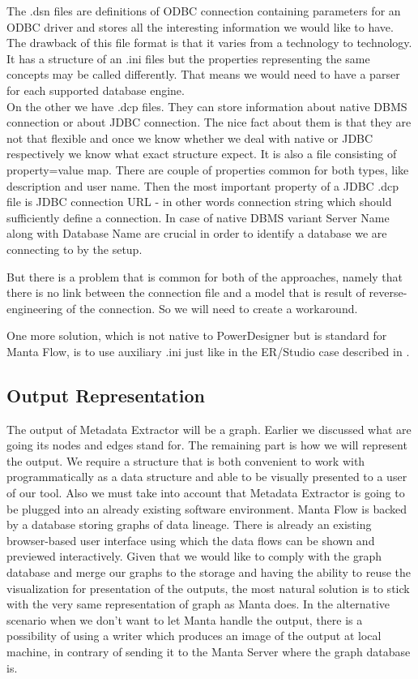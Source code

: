 The .dsn files are definitions of ODBC connection containing parameters for an ODBC driver and stores all the interesting information we would like to have. The drawback of this file format is that it varies from a technology to technology. It has a structure of an .ini files but the properties representing the same concepts may be called differently. That means we would need to have a parser for each supported database engine. \\

On the other we have .dcp files. They can store information about native DBMS connection or about JDBC connection. 
The nice fact about them is that they are not that flexible and once we know whether we deal with native or JDBC respectively we know what exact structure expect. 
It is also a file consisting of property=value map.
There are couple of properties common for both types, like description and user name.
Then the most important property of a JDBC .dcp file is JDBC connection URL - in other words connection string which should sufficiently define a connection.
In case of native DBMS variant Server Name along with Database Name are crucial in order to identify a database we are connecting to by the setup.

But there is a problem that is common for both of the approaches, namely that there is no link between the connection file and a model that is result of reverse-engineering of the connection. So we will need to create a workaround. 

One more solution, which is not native to PowerDesigner but is standard for Manta Flow, is to use auxiliary .ini just like in the ER/Studio case described in .

\subsection{Output Representation}

The output of Metadata Extractor will be a graph. Earlier we discussed what are going its nodes and edges stand for. The remaining part is how we will represent the output. We require a structure that is both convenient to work with programmatically as a data structure and able to be visually presented to a user of our tool.
Also we must take into account that Metadata Extractor is going to be plugged into an already existing software environment. 
Manta Flow is backed by a database storing graphs of data lineage. There is already an existing browser-based user interface using which the data flows can be shown and previewed interactively. Given that we would like to comply with the graph database and merge our graphs to the storage and having the ability to reuse the visualization for presentation of the outputs, the most natural solution is to stick with the very same representation of graph as Manta does.
In the alternative scenario when we don't want to let Manta handle the output, there is a possibility of using a writer which produces an image of the output at local machine, in contrary of sending it to the Manta Server where the graph database is.


